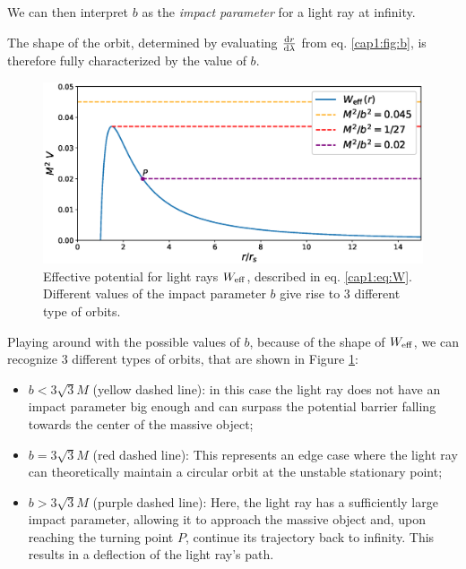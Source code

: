 We can then interpret $b$ as the \textit{impact parameter} for a light ray at
infinity.

The shape of the orbit, determined by evaluating $\dv{r}{\lambda}$ from eq.
\ref{cap1:fig:b}, is therefore fully characterized by the value of $b$.

\begin{figure}[h!]
    \centering
    \includegraphics[width = 0.8 \textwidth]{Figures/chapter1/W_eff_vs_b.eps}
    \caption{Effective potential for light rays $W_{\rm eff}$, described in eq.
        \ref{cap1:eq:W}.
        Different values of the impact parameter $b$ give rise to 3 different
        type of orbits.}
    \label{ca1:fig:W_eff_orbits}
\end{figure}

Playing around with the possible values of $b$, because of the shape of
$W_{\rm eff}$, we can recognize 3 different types of orbits, that are shown in
Figure \ref{ca1:fig:W_eff_orbits}:

\begin{itemize}
    \item $b < 3 \sqrt{3} M$ (yellow dashed line): in this case the light ray
        does not have an impact parameter big enough and can surpass the
        potential barrier falling towards the center of the massive object;
    \item $b = 3 \sqrt{3} M$ (red dashed line): This represents an edge case 
        where the light ray can theoretically maintain a circular orbit at the
        unstable stationary point;
    \item $b > 3 \sqrt{3} M$ (purple dashed line): Here, the light ray has a
        sufficiently large impact parameter, allowing it to approach the massive
        object and, upon reaching the turning point $P$, continue its trajectory
        back to infinity.
        This results in a deflection of the light ray's path.

        
\end{itemize}

